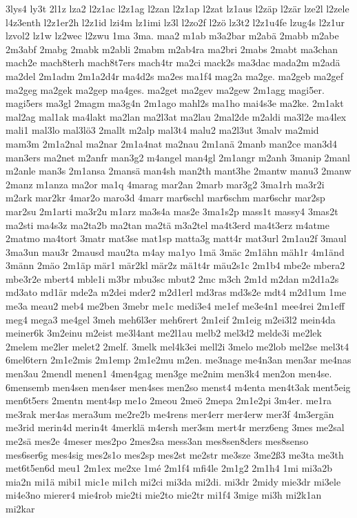 {3lys4
ly3t
2l1z
lza2
l2z1ac
l2z1ag
l2zan
l2z1ap
l2zat
lz1aus
l2zäp
l2zär
lze2l
l2zele
l4z3enth
l2z1er2h
l2z1id
lzi4m
lz1imi
lz3l
l2zo2f
l2zö
lz3t2
l2z1u4fe
lzug4s
l2z1ur
lzvol2
lz1w
lz2wec
l2zwu
1ma
3ma.
maa2
m1ab
m3a2bar
m2abä
2mabb
m2abe
2m3abf
2mabg
2mabk
m2abli
2mabm
m2ab4ra
ma2bri
2mabs
2mabt
ma3chan
mach2e
mach8terh
mach8t7ers
mach4tr
ma2ci
mack2s
ma3dac
mada2m
m2adä
ma2del
2m1adm
2m1a2d4r
ma4d2s
ma2es
ma1f4
mag2a
ma2ge.
ma2geb
ma2gef
ma2geg
ma2gek
ma2gep
ma4ges.
ma2get
ma2gev
ma2gew
2m1agg
magi5er.
magi5ers
ma3gl
2magm
ma3g4n
2m1ago
mahl2s
ma1ho
mai4s3e
ma2ke.
2m1akt
mal2ag
mal1ak
ma4lakt
ma2lan
ma2l3at
ma2lau
2mal2de
m2aldi
ma3l2e
ma4lex
mali1
mal3lo
mal3lö3
2mallt
m2alp
mal3t4
malu2
ma2l3ut
3malv
ma2mid
mam3m
2m1a2nal
ma2nar
2m1a4nat
ma2nau
2m1anä
2manb
man2ce
man3d4
man3ers
ma2net
m2anfr
man3g2
m4angel
man4gl
2m1angr
m2anh
3manip
2manl
m2anle
man3s
2m1ansa
2mansä
man4sh
man2th
mant3he
2mantw
manu3
2manw
2manz
m1anza
ma2or
ma1q
4marag
mar2an
2marb
mar3g2
3ma1rh
ma3r2i
m2ark
mar2kr
4mar2o
maro3d
4marr
mar6schl
mar6schm
mar6schr
mar2sp
mar2su
2m1arti
ma3r2u
m1arz
ma3s4a
mas2e
3ma1s2p
mass1t
massy4
3mas2t
ma2sti
ma4s3z
ma2ta2b
ma2tan
ma2tä
m3a2tel
ma4t3erd
ma4t3erz
m4atme
2matmo
ma4tort
3matr
mat3se
mat1sp
matta3g
matt4r
mat3url
2m1au2f
3maul
3ma3un
mau3r
2mausd
mau2ta
m4ay
ma1yo
1mä
3mäc
2m1ähn
mäh1r
4m1änd
3männ
2mäo
2m1äp
mär1
mär2kl
mär2z
mä1t4r
mäu2s1c
2m1b4
mbe2e
mbera2
mbe3r2e
mbert4
mble1i
m3br
mbu3sc
mbut2
2mc
m3ch
2m1d
m2dan
m2d1a2s
md3ato
md1är
mde2a
m2dei
mder2
m2d1erl
md3ras
md3s2e
mdt4
m2d1um
1me
me3a
meau2
meb4
me2ben
3mebr
me1c
medi3e4
me1ef
me3e4n1
mee4rei
2m1eff
meg4
mega3
me4gel
3meh
meh6l3er
meh6rert
2m1eif
2m1eig
m2ei3l2
mein4da
meiner6k
3m2einu
m2eist
me3l4ant
me2l1au
melb2
mel3d2
melde3i
me2lek
2melem
me2ler
melet2
2melf.
3melk
mel4k3ei
mell2i
3melo
me2lob
mel2se
mel3t4
6mel6tern
2m1e2mis
2m1emp
2m1e2mu
m2en.
me3nage
me4n3an
men3ar
me4nas
men3au
2mendl
menen1
4men4gag
men3ge
me2nim
men3k4
men2on
men4se.
6mensemb
men4sen
men4ser
men4ses
men2so
menst4
m4enta
men4t3ak
ment5eig
men6t5ers
2mentn
ment4sp
me1o
2meou
2meö
2mepa
2m1e2pi
3m4er.
me1ra
me3rak
mer4as
mera3um
me2re2b
me4rens
mer4err
mer4erw
mer3f
4m3ergän
me3rid
merin4d
merin4t
4merklä
m4ersh
mer3sm
mert4r
merz6eng
3mes
me2sal
me2sä
mes2e
4meser
mes2po
2mes2sa
mess3an
mes8sen8ders
mes8senso
mes6ser6g
mes4sig
mes2s1o
mes2sp
mes2st
me2str
me3sze
3me2ß3
me3ta
me3th
met6t5en6d
meu1
2m1ex
me2xe
1mé
2m1f4
mfi4le
2m1g2
2m1h4
1mi
mi3a2b
mia2n
mi1ä
mibi1
mic1e
mi1ch
mi2ci
mi3da
mi2di.
mi3dr
2midy
mie3dr
mi3ele
mi4e3no
mierer4
mie4rob
mie2ti
mie2to
mie2tr
mi1f4
3mige
mi3h
mi2k1an
mi2kar
}

